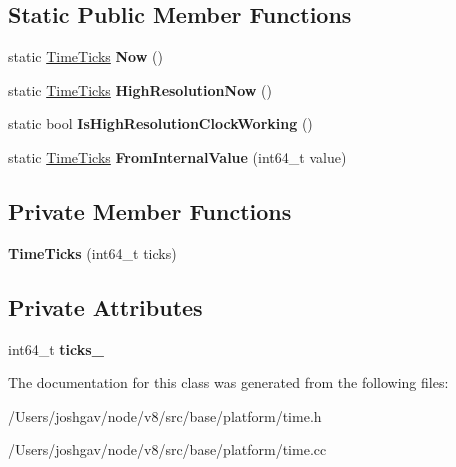 \subsection*{Static Public Member Functions}
\begin{DoxyCompactItemize}
\item 
static \hyperlink{classv8_1_1base_1_1_time_ticks}{Time\+Ticks} {\bfseries Now} ()\hypertarget{classv8_1_1base_1_1_time_ticks_ab0886bf0e84f1e1fcdc101021c2c0775}{}\label{classv8_1_1base_1_1_time_ticks_ab0886bf0e84f1e1fcdc101021c2c0775}

\item 
static \hyperlink{classv8_1_1base_1_1_time_ticks}{Time\+Ticks} {\bfseries High\+Resolution\+Now} ()\hypertarget{classv8_1_1base_1_1_time_ticks_ac7deb01c860efc1e2feb7b8fecd4d870}{}\label{classv8_1_1base_1_1_time_ticks_ac7deb01c860efc1e2feb7b8fecd4d870}

\item 
static bool {\bfseries Is\+High\+Resolution\+Clock\+Working} ()\hypertarget{classv8_1_1base_1_1_time_ticks_ad555d43f5ee18966062b2a3e2de97115}{}\label{classv8_1_1base_1_1_time_ticks_ad555d43f5ee18966062b2a3e2de97115}

\item 
static \hyperlink{classv8_1_1base_1_1_time_ticks}{Time\+Ticks} {\bfseries From\+Internal\+Value} (int64\+\_\+t value)\hypertarget{classv8_1_1base_1_1_time_ticks_aad01e6ac2517abf5a4bc3121ec18990c}{}\label{classv8_1_1base_1_1_time_ticks_aad01e6ac2517abf5a4bc3121ec18990c}

\end{DoxyCompactItemize}
\subsection*{Private Member Functions}
\begin{DoxyCompactItemize}
\item 
{\bfseries Time\+Ticks} (int64\+\_\+t ticks)\hypertarget{classv8_1_1base_1_1_time_ticks_aea1bb5dc2bb3d44ff3b8718ab346a0d2}{}\label{classv8_1_1base_1_1_time_ticks_aea1bb5dc2bb3d44ff3b8718ab346a0d2}

\end{DoxyCompactItemize}
\subsection*{Private Attributes}
\begin{DoxyCompactItemize}
\item 
int64\+\_\+t {\bfseries ticks\+\_\+}\hypertarget{classv8_1_1base_1_1_time_ticks_a6029ff94e5ec76fb6559323c0ea2b78c}{}\label{classv8_1_1base_1_1_time_ticks_a6029ff94e5ec76fb6559323c0ea2b78c}

\end{DoxyCompactItemize}


The documentation for this class was generated from the following files\+:\begin{DoxyCompactItemize}
\item 
/\+Users/joshgav/node/v8/src/base/platform/time.\+h\item 
/\+Users/joshgav/node/v8/src/base/platform/time.\+cc\end{DoxyCompactItemize}
